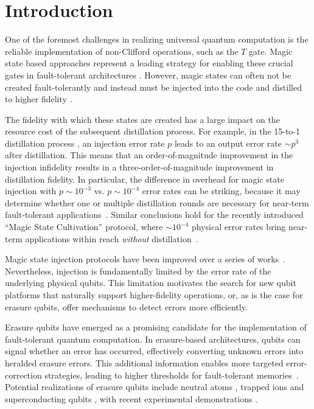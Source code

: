\documentclass[twocolumn,
notitlepage,
aps,
prx,
floatfix,
superscriptaddress
]{revtex4-2}
\begin{document}
\section{Introduction}

One of the foremost challenges in realizing universal quantum computation is the reliable implementation of non-Clifford operations, such as the $T$ gate. Magic state based approaches represent a leading strategy for enabling these crucial gates in fault-tolerant architectures
\cite{bravyi2012magic}. However, magic states can often not be created fault-tolerantly and instead must be injected into the code and distilled to higher fidelity \cite{bravyi2012magic, Horsman_201_fowler_lattice_injection,Fowler_2012, litinski2019magic}.

The fidelity with which these states are created has a large impact on the resource cost of the subsequent distillation process.
For example, in the 15-to-1 distillation process \cite{bravyi2012magic,litinski2019magic}, an injection error rate $p$ leads to an output error rate $\sim p^3$ after distillation.
This means that an order-of-magnitude improvement in the injection infidelity results in a three-order-of-magnitude improvement in distillation fidelity. %
In particular, the difference in overhead for magic state injection with $p\sim 10^{-3}$ vs. $p\sim 10^{-4}$ error rates can be striking, because it may determine whether one or multiple distillation rounds are necessary for near-term fault-tolerant applications~\cite{litinski2019magic}. Similar conclusions hold for the recently introduced ``Magic State Cultivation'' protocol, where $\sim 10^{-4}$ physical error rates bring near-term applications within reach \emph{without} distillation~\cite{gidney2024magic}.

Magic state injection protocols have been improved over a series of works~\cite{Horsman_201_fowler_lattice_injection,li2015magic, lao2022magic, gidney_hook_injection, Singh_2022XZZX_inject,chamberland2020very, bombin2024fault, gidney2024magic}. Nevertheless, injection is fundamentally limited by the error rate of the underlying physical qubits.
This limitation motivates the search for new qubit platforms that naturally support higher-fidelity operations, or, as is the case for erasure qubits, offer mechanisms to detect errors more efficiently.

Erasure qubits have emerged as a promising candidate for the implementation of fault-tolerant quantum computation.
In erasure-based architectures, qubits can signal whether an error has occurred, effectively converting unknown errors into heralded erasure errors.
This additional information enables more targeted error-correction strategies, leading to higher thresholds for fault-tolerant memories~\cite{Wu_2022atoms, Kubica_2023}.
Potential realizations of erasure qubits include neutral atoms \cite{Wu_2022atoms}, trapped ions \cite{Kang_2023ions} and superconducting qubits \cite{Kubica_2023,Teoh_2023cavities}, with recent experimental demonstrations
\cite{Ma_2023atom_exp,Scholl_2023atom_exp,koottandavida2024erasure,Levine_2024}. 
\end{document}
